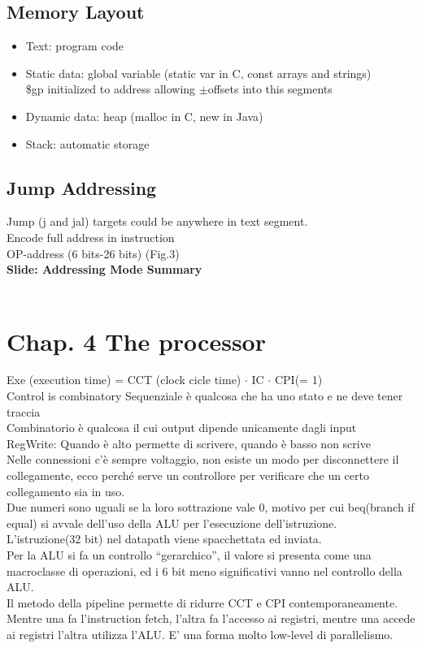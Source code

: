 \documentclass[12pt, a4paper]{article}
\begin{document}
	\subsection*{Memory Layout}
	\begin{itemize}
		\item Text: program code
		\item Static data: global variable (static var in C, const arrays and strings) \\
			\$gp initialized to address allowing $\pm$offsets into this segments
		\item Dynamic data: heap (malloc in C, new in Java)
		\item Stack: automatic storage
	\end{itemize} 
	
	\subsection*{Jump Addressing}
	Jump (j and jal) targets could be anywhere in text segment. \\

	Encode full address in instruction \\
	OP-address (6 bits-26 bits) (Fig.3)\\
	\textbf{Slide: Addressing Mode Summary} \\\\
	
	\section*{Chap. 4  The processor}
	
	Exe (execution time) = CCT (clock cicle time) $\cdot$ IC $\cdot$ CPI(= 1) \\
	Control is combinatory
	Sequenziale è qualcosa che ha uno stato e ne deve tener traccia \\
	Combinatorio è qualcosa il cui output dipende unicamente dagli input \\ 
	RegWrite: Quando è alto permette di scrivere, quando è basso non scrive \\

	Nelle connessioni c'è sempre voltaggio, non esiste un modo per disconnettere il collegamente, ecco perché serve un controllore per verificare che un certo collegamento sia in uso.	\\
	
	Due numeri sono uguali se la loro sottrazione vale 0, motivo per cui beq(branch if equal) si avvale dell'uso della ALU per l'esecuzione dell'istruzione.
\\  L'istruzione(32 bit) nel datapath viene spacchettata ed inviata. \\
	Per la ALU si fa un controllo ``gerarchico'', il valore si presenta come una macroclasse di operazioni, ed i 6 bit meno significativi vanno nel controllo della ALU.\\
	Il metodo della pipeline permette di ridurre CCT e CPI contemporaneamente. Mentre una fa l'instruction fetch, l'altra fa l'accesso ai registri, mentre una accede ai registri l'altra utilizza l'ALU. E' una forma molto low-level di parallelismo.
	
\end{document}
